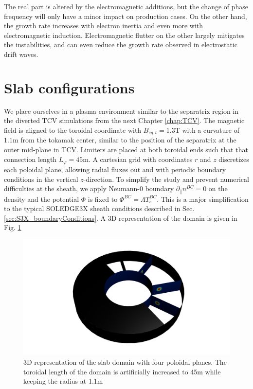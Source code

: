 The real part is altered by the electromagnetic additions, but the change of phase frequency will only have a minor impact on production cases. On the other hand, the growth rate increases with electron inertia and even more with electromagnetic induction. Electromagnetic flutter on the other largely mitigates the instabilities, and can even reduce the growth rate observed in electrostatic drift waves.



\section{Slab configurations}
\label{sec:anal_SLAB}

We place ourselves in a plasma environment similar to the separatrix region in the diverted TCV simulations from the next Chapter \ref{chap:TCV}. The magnetic field is aligned to the toroidal coordinate with $B_{eq,t} = 1.3$T with a curvature of $1.1$m from the tokamak center, similar to the position of the separatrix at the outer mid-plane in TCV. Limiters are placed at both toroidal ends such that that connection length $L_\varphi = 45$m. A cartesian grid with coordinates $r$ and $z$ discretizes each poloidal plane, allowing radial fluxes out and with periodic boundary conditions in the vertical $z$-direction. To simplify the study and prevent numerical difficulties at the sheath, we apply Neumann-0 boundary $\partial_\parallel n^{BC} = 0$ on the density and the potential $\Phi$ is fixed to $\Phi^{BC} = \Lambda T_e^{BC}$. This is a major simplification to the typical SOLEDGE3X sheath conditions described in Sec. \ref{sec:S3X_boundaryConditions}. A 3D representation of the domain is given in Fig. \ref{fig:anal_slabDomain}


\begin{figure}[H]\centering
	\centering
	\includegraphics[width=.8\textwidth]{schemes/3DblobView.png}
	\caption{3D representation of the slab domain with four poloidal planes. The toroidal length of the domain is artificially increased to 45m while keeping the radius at 1.1m}
	\label{fig:anal_slabDomain}
\end{figure}


